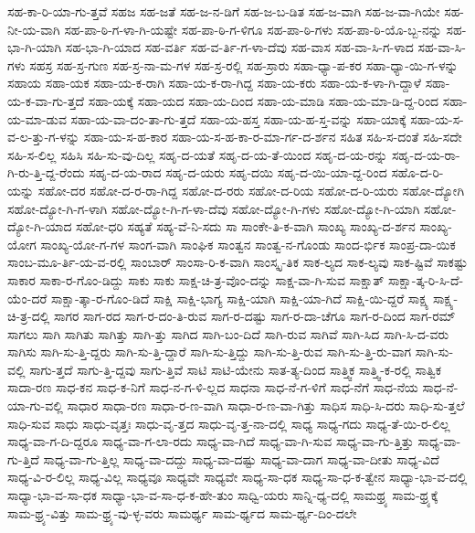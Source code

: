 {ಸಹ-ಕಾ-ರಿ-ಯಾ-ಗು-ತ್ತವೆ
ಸಹಜ
ಸಹ-ಜತೆ
ಸಹ-ಜ-ನ-ಡಿಗೆ
ಸಹ-ಜ-ಬ-ಡಿತ
ಸಹ-ಜ-ವಾಗಿ
ಸಹ-ಜ-ವಾ-ಗಿಯೇ
ಸಹ-ನೀ-ಯ-ವಾಗಿ
ಸಹ-ಪಾ-ಠಿ-ಗ-ಳಾ-ಗಿ-ಯಷ್ಟೇ
ಸಹ-ಪಾ-ಠಿ-ಗ-ಳಿಗೂ
ಸಹ-ಪಾ-ಠಿ-ಗಳು
ಸಹ-ಪಾ-ಠಿ-ಯೊ-ಬ್ಬ-ನನ್ನು
ಸಹ-ಭಾ-ಗಿ-ಯಾಗಿ
ಸಹ-ಭಾ-ಗಿ-ಯಾದ
ಸಹ-ವರ್ತಿ
ಸಹ-ವ-ರ್ತಿ-ಗ-ಳಾ-ದೆವು
ಸಹ-ವಾಸ
ಸಹ-ವಾ-ಸಿ-ಗ-ಳಾದ
ಸಹ-ವಾ-ಸಿ-ಗಳು
ಸಹಸ್ರ
ಸಹ-ಸ್ರ-ಗುಣ
ಸಹ-ಸ್ರ-ನಾ-ಮ-ಗಳ
ಸಹ-ಸ್ರ-ರಲ್ಲಿ
ಸಹ-ಸ್ರಾರು
ಸಹಾ-ಧ್ಯಾ-ಪ-ಕರ
ಸಹಾ-ಧ್ಯಾ-ಯಿ-ಗ-ಳನ್ನು
ಸಹಾಯ
ಸಹಾ-ಯಕ
ಸಹಾ-ಯ-ಕ-ರಾಗಿ
ಸಹಾ-ಯ-ಕ-ರಾ-ಗಿದ್ದ
ಸಹಾ-ಯ-ಕರು
ಸಹಾ-ಯ-ಕ-ಳಾ-ಗಿ-ದ್ದಾಳೆ
ಸಹಾ-ಯ-ಕ-ವಾ-ಗು-ತ್ತದೆ
ಸಹಾ-ಯಕ್ಕೆ
ಸಹಾ-ಯದ
ಸಹಾ-ಯ-ದಿಂದ
ಸಹಾ-ಯ-ಮಾಡಿ
ಸಹಾ-ಯ-ಮಾ-ಡಿ-ದ್ದ-ರಿಂದ
ಸಹಾ-ಯ-ಮಾ-ಡುವ
ಸಹಾ-ಯ-ವಾ-ದಂ-ತಾ-ಗು-ತ್ತದೆ
ಸಹಾ-ಯ-ಹಸ್ತ
ಸಹಾ-ಯ-ಹ-ಸ್ತ-ವನ್ನು
ಸಹಾ-ಯಾಕ್ಕೆ
ಸಹಾ-ಯ-ಸ-ವ-ಲ-ತ್ತು-ಗ-ಳನ್ನು
ಸಹಾ-ಯ-ಸ-ಹ-ಕಾರ
ಸಹಾ-ಯ-ಸ-ಹ-ಕಾ-ರ-ಮಾ-ರ್ಗ-ದ-ರ್ಶನ
ಸಹಿತ
ಸಹಿ-ಸ-ದಂತೆ
ಸಹಿ-ಸದೇ
ಸಹಿ-ಸ-ಲಿಲ್ಲ
ಸಹಿಸಿ
ಸಹಿ-ಸು-ವು-ದಿಲ್ಲ
ಸಹೃ-ದ-ಯತೆ
ಸಹೃ-ದ-ಯ-ತೆ-ಯಿಂದ
ಸಹೃ-ದ-ಯ-ರನ್ನು
ಸಹೃ-ದ-ಯ-ರಾ-ಗಿ-ರು-ತ್ತಿ-ದ್ದ-ರೆಂದು
ಸಹೃ-ದ-ಯ-ರಾದ
ಸಹೃ-ದ-ಯರು
ಸಹೃ-ದಯಿ
ಸಹೃ-ದ-ಯಿ-ಯಾ-ದ್ದ-ರಿಂದ
ಸಹೊ-ದ-ರಿ-ಯನ್ನು
ಸಹೋ-ದರ
ಸಹೋ-ದ-ರ-ರಾ-ಗಿದ್ದ
ಸಹೋ-ದ-ರರು
ಸಹೋ-ದ-ರಿಯ
ಸಹೋ-ದ-ರಿ-ಯರು
ಸಹೋ-ದ್ಯೋಗಿ
ಸಹೋ-ದ್ಯೋ-ಗಿ-ಗ-ಳಾಗಿ
ಸಹೋ-ದ್ಯೋ-ಗಿ-ಗ-ಳಾ-ದೆವು
ಸಹೋ-ದ್ಯೋ-ಗಿ-ಗಳು
ಸಹೋ-ದ್ಯೋ-ಗಿ-ಯಾಗಿ
ಸಹೋ-ದ್ಯೋ-ಗಿ-ಯಾದ
ಸಹೋ-ಧರಿ
ಸಹ್ಯತೆ
ಸಹ್ಯ-ವೆ-ನಿ-ಸದು
ಸಾ
ಸಾಂಕೇ-ತಿ-ಕ-ವಾಗಿ
ಸಾಂಖ್ಯ
ಸಾಂಖ್ಯ-ದ-ರ್ಶನ
ಸಾಂಖ್ಯ-ಯೋಗ
ಸಾಂಖ್ಯ-ಯೋ-ಗ-ಗಳ
ಸಾಂಗ-ವಾಗಿ
ಸಾಂಘಿಕ
ಸಾಂತ್ವನ
ಸಾಂತ್ವ-ನ-ಗೊಂಡು
ಸಾಂದ-ರ್ಭಿಕ
ಸಾಂಪ್ರ-ದಾ-ಯಿಕ
ಸಾಂಬ-ಮೂ-ರ್ತಿ-ಯ-ವ-ರಲ್ಲಿ
ಸಾಂಬಾರ್
ಸಾಂಸಾ-ರಿ-ಕ-ವಾಗಿ
ಸಾಂಸ್ಕೃ-ತಿಕ
ಸಾಕ-ಲ್ಯದ
ಸಾಕ-ಲ್ಯವು
ಸಾಕ-ಷ್ಟಿವೆ
ಸಾಕಷ್ಟು
ಸಾಕಾರ
ಸಾಕಾ-ರ-ಗೊಂ-ಡಿದ್ದು
ಸಾಕು
ಸಾಕು
ಸಾಕ್ಷ-ಚಿ-ತ್ರ-ವೊಂ-ದನ್ನು
ಸಾಕ್ಷ-ವಾ-ಗಿ-ಸುವ
ಸಾಕ್ಷಾತ್
ಸಾಕ್ಷಾ-ತ್ಕ-ರಿ-ಸಿ-ದೆ-ಯೆಂ-ದರೆ
ಸಾಕ್ಷಾ-ತ್ಕಾ-ರ-ಗೊಂ-ಡಿದೆ
ಸಾಕ್ಷಿ
ಸಾಕ್ಷಿ-ಭಾಗ್ಯ
ಸಾಕ್ಷಿ-ಯಾಗಿ
ಸಾಕ್ಷಿ-ಯಾ-ಗಿದೆ
ಸಾಕ್ಷಿ-ಯಿ-ದ್ದರೆ
ಸಾಕ್ಷ್ಯ
ಸಾಕ್ಷ್ಯ-ಚಿ-ತ್ರ-ದಲ್ಲಿ
ಸಾಗರ
ಸಾಗ-ರದ
ಸಾಗ-ರ-ದಂ-ತಿ-ರುವ
ಸಾಗ-ರ-ದಷ್ಟು
ಸಾಗ-ರ-ದಾ-ಚೆಗೂ
ಸಾಗ-ರ-ದಿಂದ
ಸಾಗ-ರಮ್
ಸಾಗಲು
ಸಾಗಿ
ಸಾಗಿತು
ಸಾಗಿತ್ತು
ಸಾಗಿ-ತ್ತು	
ಸಾಗಿದ
ಸಾಗಿ-ಬಂ-ದಿದೆ
ಸಾಗಿ-ರುವ
ಸಾಗಿವೆ
ಸಾಗಿ-ಸಿದ
ಸಾಗಿ-ಸಿ-ದ-ವರು
ಸಾಗಿಸು
ಸಾಗಿ-ಸು-ತ್ತಿ-ದ್ದರು
ಸಾಗಿ-ಸು-ತ್ತಿ-ದ್ದಾರೆ
ಸಾಗಿ-ಸು-ತ್ತಿದ್ದು
ಸಾಗಿ-ಸು-ತ್ತಿ-ರುವ
ಸಾಗಿ-ಸು-ತ್ತಿ-ರು-ವಾಗ
ಸಾಗಿ-ಸು-ವಲ್ಲಿ
ಸಾಗು-ತ್ತದೆ
ಸಾಗು-ತ್ತಿ-ದ್ದವು
ಸಾಗು-ತ್ತಿವೆ
ಸಾಟಿ
ಸಾಟಿ-ಯೇನು
ಸಾತ-ತ್ಯ-ದಿಂದ
ಸಾತ್ತ್ವಿಕ
ಸಾತ್ತ್ವಿ-ಕ-ರಲ್ಲಿ
ಸಾತ್ವಿಕ
ಸಾದಾ-ರಣ
ಸಾಧ-ಕನ
ಸಾಧ-ಕ-ನಿಗೆ
ಸಾಧ-ನ-ಗ-ಳಿ-ಲ್ಲದ
ಸಾಧನಾ
ಸಾಧ-ನೆ-ಗ-ಳಿಗೆ
ಸಾಧ-ನೆಗೆ
ಸಾಧ-ನೆಯ
ಸಾಧ-ನೆ-ಯಾ-ಗು-ವಲ್ಲಿ
ಸಾಧಾರ
ಸಾಧಾ-ರಣ
ಸಾಧಾ-ರ-ಣ-ವಾಗಿ
ಸಾಧಾ-ರ-ಣ-ವಾ-ಗಿತ್ತು
ಸಾಧಿಸ
ಸಾಧಿ-ಸಿ-ದರು
ಸಾಧಿ-ಸು-ತ್ತಲೆ
ಸಾಧಿ-ಸುವ
ಸಾಧು
ಸಾಧು-ವೃತ್ತಃ
ಸಾಧು-ವೃ-ತ್ತದ
ಸಾಧು-ವೃ-ತ್ತ-ನಾ-ದಲ್ಲಿ
ಸಾಧ್ಯ
ಸಾಧ್ಯ-ಗದು
ಸಾಧ್ಯ-ತೆ-ಯಿ-ರ-ಲಿಲ್ಲ
ಸಾಧ್ಯ-ವಾ-ಗ-ದಿ-ದ್ದರೂ
ಸಾಧ್ಯ-ವಾ-ಗ-ಲಾ-ರದು
ಸಾಧ್ಯ-ವಾ-ಗಿದೆ
ಸಾಧ್ಯ-ವಾ-ಗಿ-ಸುವ
ಸಾಧ್ಯ-ವಾ-ಗು-ತ್ತಿತ್ತು
ಸಾಧ್ಯ-ವಾ-ಗು-ತ್ತಿದೆ
ಸಾಧ್ಯ-ವಾ-ಗು-ತ್ತಿಲ್ಲ
ಸಾಧ್ಯ-ವಾ-ದದ್ದು
ಸಾಧ್ಯ-ವಾ-ದಷ್ಟು
ಸಾಧ್ಯ-ವಾ-ದಾಗ
ಸಾಧ್ಯ-ವಾ-ದೀತು
ಸಾಧ್ಯ-ವಿದೆ
ಸಾಧ್ಯ-ವಿ-ರ-ಲಿಲ್ಲ
ಸಾಧ್ಯ-ವಿಲ್ಲ
ಸಾಧ್ಯವೂ
ಸಾಧ್ಯವೇ
ಸಾಧ್ಯವೇ
ಸಾಧ್ಯ-ಸಾ-ಧಕ
ಸಾಧ್ಯ-ಸಾ-ಧ-ಕ-ತ್ವೇನ
ಸಾಧ್ಯಾ-ಭಾ-ವ-ದಲ್ಲಿ
ಸಾಧ್ಯಾ-ಭಾ-ವ-ಸಾ-ಧಕ
ಸಾಧ್ಯಾ-ಭಾ-ವ-ಸಾ-ಧ-ಕ-ಹೇ-ತುಂ
ಸಾಧ್ವಿ-ಯರು
ಸಾನ್ನಿ-ಧ್ಯ-ದಲ್ಲಿ
ಸಾಮಥ್ರ್ಯ
ಸಾಮ-ಥ್ರ್ಯಕ್ಕೆ
ಸಾಮ-ಥ್ರ್ಯ-ವಿತ್ತು
ಸಾಮ-ಥ್ರ್ಯ-ವು-ಳ್ಳ-ವರು
ಸಾಮರ್ಥ್ಯ
ಸಾಮ-ರ್ಥ್ಯದ
ಸಾಮ-ರ್ಥ್ಯ-ದಿಂ-ದಲೇ
}
